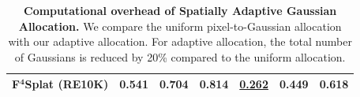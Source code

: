 \begin{table}[t]
\begin{minipage}[t]{0.51\linewidth}
{\begin{tabular}{lccc ccc}
        \textbf{F$^\mathbf{4}$Splat} (RE10K)
        & \textbf{0.541} & \textbf{0.704} & \textbf{0.814} 
        & \underline{0.262} & \textbf{0.449} & \textbf{0.618} \\
        \bottomrule
    \end{tabular}
    }
\end{minipage}
\hfill
\begin{minipage}[t]{0.44\linewidth}
    \captionsetup{type=table}
    \caption{\textbf{Computational overhead of Spatially Adaptive Gaussian Allocation.}
    We compare the uniform pixel-to-Gaussian allocation with our adaptive allocation. 
    For adaptive allocation, the total number of Gaussians is reduced by 20\% compared to the uniform allocation.}
    \vspace{-4pt}
    \label{sup_tab:adaptive_cost}
    \centering
    \setlength{\tabcolsep}{0.12cm}
    \renewcommand{\arraystretch}{0.95}
\end{minipage}
\end{table}
